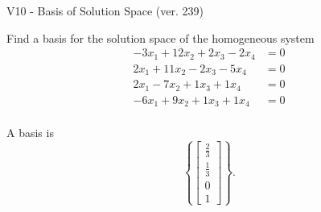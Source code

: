 \begin{exercise}
  \begin{exerciseTitle}V10 - Basis of Solution Space (ver. 239)\end{exerciseTitle}
  \begin{exerciseStatement}
    Find a basis for the solution space of the homogeneous system 
\begin{align*}
 -3 x_ 1 + 12 x_ 2 + 2 x_ 3 -2 x_ 4 &= 0  \\ 
  2 x_ 1 + 11 x_ 2 -2 x_ 3 -5 x_ 4 &= 0  \\ 
  2 x_ 1 -7 x_ 2 + 1 x_ 3 + 1 x_ 4 &= 0  \\ 
  -6 x_ 1 + 9 x_ 2 + 1 x_ 3 + 1 x_ 4 &= 0  \\ 
 \end{align*}


 
  \end{exerciseStatement}

  \begin{exerciseAnswer}
   A basis is   
\[\left\{\left[\begin{array}{c}
\frac{2}{3} \\
\frac{1}{3} \\
0 \\
1
\end{array}\right]\right\}.\]

  


  \end{exerciseAnswer}
\end{exercise}